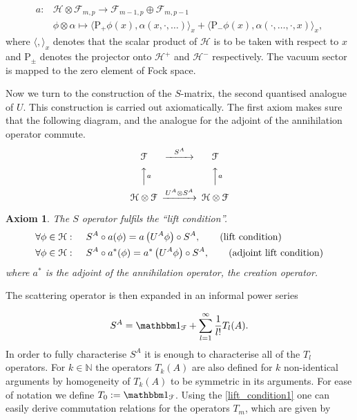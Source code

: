 \documentclass[b5paper,draft,openbib,12pt]{memoir}
\newtheorem{axiom}{Axiom}
\newcommand{\id}{{\mathbbm 1}}
\begin{document}
\begin{equation}
\begin{aligned}
a: &\mathcal{H}\otimes \mathcal{F}_{m,p} \rightarrow \mathcal{F}_{m-1,p}\oplus \mathcal{F}_{m,p-1}\\
&\phi \otimes \alpha \mapsto \langle \mathrm{P}_+ \phi (x),\alpha (x,\cdot,\dots)\rangle_x + \langle \mathrm{P}_- \phi (x),\alpha (\cdot,\dots, \cdot, x)\rangle_x,
\end{aligned}
\end{equation}
where \(\langle, \rangle_x\) denotes that the scalar product of \(\mathcal{H}\) is to be taken with respect to \(x\) and \(\mathrm{P}_{\pm}\) denotes the projector onto \(\mathcal{H}^+\) and \(\mathcal{H}^-\) respectively. The vacuum sector is mapped to the zero element of Fock space. 

Now we turn to the construction of the \(S\)-matrix, the second quantised analogue of \(U\). This construction is carried out axiomatically. The first axiom makes sure that the following diagram, and the analogue for the adjoint of the annihilation operator commute.
\begin{equation}
\begin{CD}								%
\mathcal{F}     @>S^A>>  \mathcal{F}\\
@AAaA        @AAaA\\
\mathcal{H}\otimes \mathcal{F}     @>U^A\otimes S^A>>  \mathcal{H}\otimes \mathcal{F} 
\end{CD}
\end{equation}
\begin{axiom}
The \(S\) operator fulfils the ``lift condition''.
\begin{align}\label{lift_condition1}
\forall \phi\in \mathcal{H}:& \hspace{0.5cm} S^A \circ a(\phi)=a\left( U^A \phi \right)  \circ S^A,\tag{lift condition}\\
\forall \phi\in \mathcal{H}:& \hspace{0.5cm} S^A \circ a^*(\phi)=a^*\left( U^A \phi \right)  \circ S^A,\tag{adjoint lift condition}
\end{align}
where \(a^*\) is the adjoint of the annihilation operator, the creation operator. 
\end{axiom}
The scattering operator is then expanded in an informal 
power series

\begin{equation}\label{S_expansion}
S^A=\id_\mathcal{F}+\sum_{l=1}^\infty \frac{1}{l!} T_l(A).
\end{equation}
In order to fully characterise \(S^A\) it is enough to characterise all of the \(T_l\) operators. For \(k\in \mathbb{N}\)
the operators \(T_k (A)\) are also defined for \(k\) non-identical arguments by homogeneity of
\(T_k(A)\) to be symmetric in its arguments. For ease of notation we define \(T_0:=\id_\mathcal{F}\).
Using the \eqref{lift_condition1} one can easily derive commutation relations for the operators 
\(T_m\), which are given by
\end{document}
